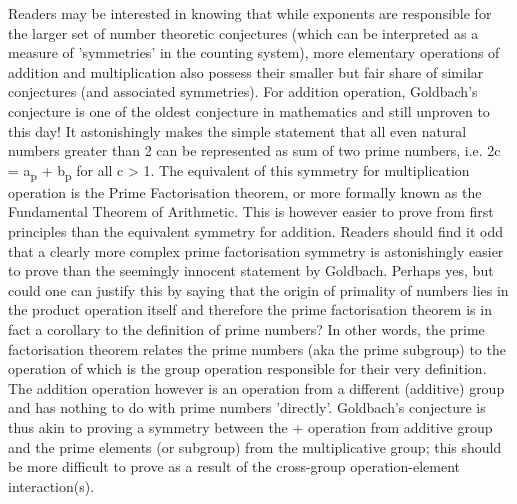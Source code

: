 \documentclass[a4paper,10pt]{article}
\begin{document}
\begin{flushleft}
{{	\textbf{\large{}}\linebreak\linebreak
	Readers may be interested in knowing that while exponents are responsible for the larger set of number theoretic conjectures (which can be interpreted as a measure of 'symmetries' in the counting system), more elementary operations of addition and multiplication also possess their smaller but fair share of similar conjectures (and associated symmetries). For addition operation, Goldbach's conjecture is one of the oldest conjecture in mathematics and still unproven to this day! It astonishingly makes the simple statement that all even natural numbers greater than 2 can be represented as sum of two prime numbers, i.e. 2{\cdot}c = a\textsubscript{p} + b\textsubscript{p} for all c > 1. The equivalent of this symmetry for multiplication operation is the Prime Factorisation theorem, or more formally known as the Fundamental Theorem of Arithmetic. This is however easier to prove from first principles than the equivalent symmetry for addition.\linebreak\linebreak
	Readers should find it odd that a clearly more complex prime factorisation symmetry is astonishingly easier to prove than the seemingly innocent statement by Goldbach. Perhaps yes, but could one can justify this by saying that the origin of primality of numbers lies in the product operation itself and therefore the prime factorisation theorem is in fact a corollary to the definition of prime numbers? In other words, the prime factorisation theorem relates the prime numbers (aka the prime subgroup) to the operation of {\times} which is the group operation responsible for their very definition. The addition operation however is an operation from a different (additive) group and has nothing to do with prime numbers 'directly'. Goldbach's conjecture is thus akin to proving a symmetry between the + operation from additive group and the prime elements (or subgroup) from the multiplicative group; this should be more difficult to prove as a result of the cross-group operation-element interaction(s).\linebreak\linebreak
}}
\end{flushleft}
\end{document}
